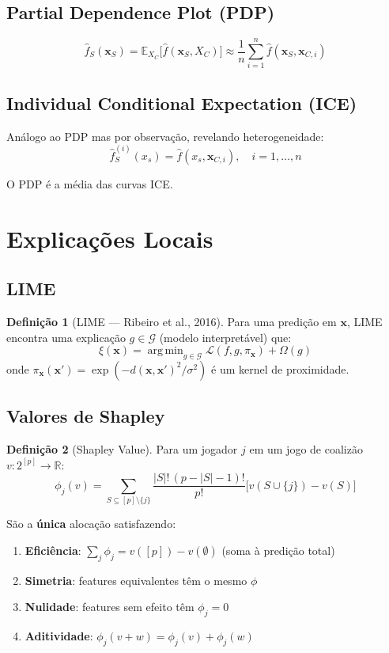 \documentclass[12pt,a4paper,twoside]{book}
\theoremstyle{definition}
\newtheorem{definicao}{Definição}[chapter]
\theoremstyle{remark}
\newcommand{\R}{\mathbb{R}}
\newcommand{\E}{\mathbb{E}}
\newcommand{\bx}{\bm{x}}
\DeclareMathOperator*{\argmin}{arg\,min}
\begin{document}
\subsection{Partial Dependence Plot (PDP)}

\[
\hat{f}_S(\bx_S) = \E_{X_C}\bigl[\hat{f}(\bx_S, X_C)\bigr] \approx \frac{1}{n}\sum_{i=1}^n \hat{f}(\bx_S, \bx_{C,i})
\]

\subsection{Individual Conditional Expectation (ICE)}

Análogo ao PDP mas por observação, revelando heterogeneidade:
\[
\hat{f}^{(i)}_S(x_s) = \hat{f}(x_s, \bx_{C,i}), \quad i=1,\ldots,n
\]

O PDP é a média das curvas ICE.

\section{Explicações Locais}

\subsection{LIME}

\begin{definicao}[LIME — Ribeiro et al., 2016]
Para uma predição em $\bx$, LIME encontra uma explicação $g \in \mathcal{G}$ (modelo interpretável) que:
\[
\xi(\bx) = \argmin_{g \in \mathcal{G}} \mathcal{L}(f, g, \pi_\bx) + \Omega(g)
\]
onde $\pi_\bx(\bx') = \exp(-d(\bx,\bx')^2/\sigma^2)$ é um kernel de proximidade.
\end{definicao}

\subsection{Valores de Shapley}

\begin{definicao}[Shapley Value]
Para um jogador $j$ em um jogo de coalizão $v: 2^{[p]} \to \R$:
\[
\phi_j(v) = \sum_{S \subseteq [p] \setminus \{j\}} \frac{|S|!\,(p-|S|-1)!}{p!}\bigl[v(S \cup \{j\}) - v(S)\bigr]
\]
\end{definicao}

\begin{tcolorbox}[teobox,title=Axiomas dos Valores de Shapley]
São a \textbf{única} alocação satisfazendo:
\begin{enumerate}
  \item \textbf{Eficiência}: $\sum_j \phi_j = v([p]) - v(\emptyset)$ (soma à predição total)
  \item \textbf{Simetria}: features equivalentes têm o mesmo $\phi$
  \item \textbf{Nulidade}: features sem efeito têm $\phi_j = 0$
  \item \textbf{Aditividade}: $\phi_j(v+w) = \phi_j(v) + \phi_j(w)$
\end{enumerate}
\end{tcolorbox}
\end{document}
